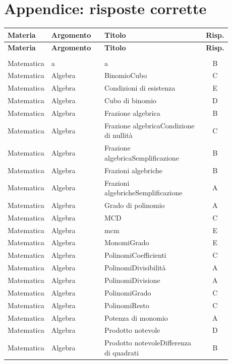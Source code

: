 \documentclass[20pt, a4paper]{article}
\begin{document}
\section*{Appendice: risposte corrette}
\begin{longtable}{@{}>{\raggedright\arraybackslash}p{0.18\linewidth}>{\raggedright\arraybackslash}p{0.24\linewidth}>{\raggedright\arraybackslash}p{0.46\linewidth}c@{}}
\toprule
\textbf{Materia} & \textbf{Argomento} & \textbf{Titolo} & \textbf{Risp.} \\
\midrule
\endfirsthead
\toprule
\textbf{Materia} & \textbf{Argomento} & \textbf{Titolo} & \textbf{Risp.} \\
\midrule
\endhead
\midrule
\multicolumn{4}{r}{\footnotesize\textit{Continua}} \\
\endfoot
\bottomrule
\endlastfoot
Matematica & a & a & B \\
Matematica & Algebra & BinomioCubo & C \\
Matematica & Algebra & Condizioni di esistenza & E \\
Matematica & Algebra & Cubo di binomio & D \\
Matematica & Algebra & Frazione algebrica & B \\
Matematica & Algebra & Frazione algebricaCondizione di nullità & C \\
Matematica & Algebra & Frazione algebricaSemplificazione & B \\
Matematica & Algebra & Frazioni algebriche & B \\
Matematica & Algebra & Frazioni algebricheSemplificazione & A \\
Matematica & Algebra & Grado di polinomio & A \\
Matematica & Algebra & MCD & C \\
Matematica & Algebra & mcm & E \\
Matematica & Algebra & MonomiGrado & E \\
Matematica & Algebra & PolinomiCoefficienti & C \\
Matematica & Algebra & PolinomiDivisibilità & A \\
Matematica & Algebra & PolinomiDivisione & A \\
Matematica & Algebra & PolinomiGrado & C \\
Matematica & Algebra & PolinomiResto & C \\
Matematica & Algebra & Potenza di monomio & A \\
Matematica & Algebra & Prodotto notevole & D \\
Matematica & Algebra & Prodotto notevoleDifferenza di quadrati & B \\

\end{longtable}
\end{document}
